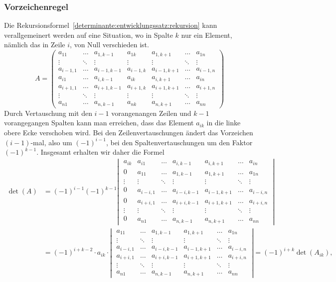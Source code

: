 \subsubsection{Vorzeichenregel}
Die Rekursionsformel~\eqref{determinante:entwicklungssatz:rekursion}
kann verallgemeinert werden auf eine Situation, wo in Spalte $k$
nur ein Element, nämlich das in Zeile $i$, von Null verschieden ist.
\[
A=
\begin{pmatrix}
a_{  1 1}&\dots &a_{  1,k-1}&a_{  1 k}&a_{  1,k+1}&\dots &a_{  1 n}\\
\vdots   &\ddots&\vdots     &\vdots   &\vdots     &\ddots&\vdots   \\
a_{i-1,1}&\dots &a_{i-1,k-1}&a_{i-1,k}&a_{i-1,k+1}&\dots &a_{i-1,n}\\
a_{  i 1}&\dots &a_{  i,k-1}&a_{  i k}&a_{  i,k+1}&\dots &a_{  i n}\\
a_{i+1,1}&\dots &a_{i+1,k-1}&a_{i+1,k}&a_{i+1,k+1}&\dots &a_{i+1,n}\\
\vdots   &\ddots&\vdots     &\vdots   &\vdots     &\ddots&\vdots   \\
a_{  n 1}&\dots &a_{  n,k-1}&a_{  n k}&a_{  n,k+1}&\dots &a_{  n n}
\end{pmatrix}
\]
Durch Vertauschung mit den $i-1$ vorangenangen Zeilen und $k-1$
vorangegangen Spalten kann man erreichen, dass das Element $a_{ik}$
in die linke obere Ecke verschoben wird.
Bei den Zeilenvertauschungen ändert das Vorzeichen $(i-1)$-mal, also
um $(-1)^{i-1}$, bei den Spaltenvertauschungen um den Faktor $(-1)^{k-1}$.
Insgesamt erhalten wir daher die Formel
\begin{align*}
\det(A)
&=
(-1)^{i-1}(-1)^{k-1}
\left|\;\begin{matrix}
a_{ik}&a_{  i 1}&\dots &a_{  i,k-1}&a_{  i,k+1}&\dots &a_{  i n}\\
  0   &a_{  1 1}&\dots &a_{  1,k-1}&a_{  1,k+1}&\dots &a_{  1 n}\\
\vdots&\vdots   &\ddots&\vdots     &\vdots     &\ddots&\vdots   \\
  0   &a_{i-i,1}&\dots &a_{i-i,k-1}&a_{i-1,k+1}&\dots &a_{i-i,n}\\
  0   &a_{i+i,1}&\dots &a_{i+i,k-1}&a_{i+1,k+1}&\dots &a_{i+i,n}\\
\vdots&\vdots   &\ddots&\vdots     &\vdots     &\ddots&\vdots   \\
  0   &a_{  n 1}&\dots &a_{  n,k-1}&a_{  n,k+1}&\dots &a_{  n n}
\end{matrix}\;\right|
\\
&=
(-1)^{i+k-2}
\cdot
a_{ik}
\cdot
\left|\;\begin{matrix}
a_{  1 1}&\dots &a_{  1,k-1}&a_{  1,k+1}&\dots &a_{  1 n}\\
\vdots   &\ddots&\vdots     &\vdots     &\ddots&\vdots   \\
a_{i-i,1}&\dots &a_{i-i,k-1}&a_{i-1,k+1}&\dots &a_{i-i,n}\\
a_{i+i,1}&\dots &a_{i+i,k-1}&a_{i+1,k+1}&\dots &a_{i+i,n}\\
\vdots   &\ddots&\vdots     &\vdots     &\ddots&\vdots   \\
a_{  n 1}&\dots &a_{  n,k-1}&a_{  n,k+1}&\dots &a_{  n n}
\end{matrix}\;\right|
=
(-1)^{i+k}\det(A_{ik}),
\end{align*}
